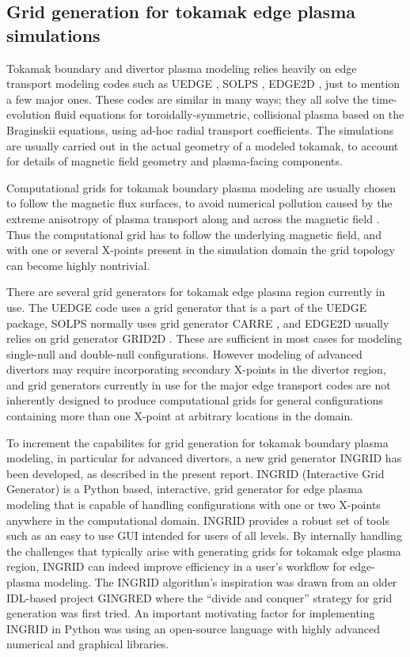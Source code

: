 \subsection{Grid generation for tokamak edge plasma simulations}

Tokamak boundary and divertor plasma modeling relies heavily on edge
transport modeling codes such as UEDGE \cite{Rognlien1999}, SOLPS
\cite{Wiesen2015}, EDGE2D \cite{Simonini1994}, just to mention a few
major ones. These codes are similar in many ways; they all solve the
time-evolution fluid equations for toroidally-symmetric, collisional
plasma based on the Braginskii equations, using ad-hoc radial
transport coefficients. The simulations are usually carried out in the
actual geometry of a modeled tokamak, to account for details of
magnetic field geometry and plasma-facing components.

Computational grids for tokamak boundary plasma modeling are usually
chosen to follow the magnetic flux surfaces, to avoid numerical
pollution caused by the extreme anisotropy of plasma transport along
and across the magnetic field \cite{Umansky2005}. Thus the
computational grid has to follow the underlying magnetic field, and
with one or several X-points present in the simulation domain the grid
topology can become highly nontrivial.

There are several grid generators for tokamak edge plasma region
currently in use. The UEDGE code uses a grid generator that is a part
of the UEDGE package, SOLPS normally uses grid generator CARRE
\cite{Marchand1996}, and EDGE2D usually relies on grid generator GRID2D
\cite{Taroni1992}. These are sufficient in most cases for modeling
single-null and double-null configurations. However modeling of
advanced divertors may require incorporating secondary X-points in the
divertor region, and grid generators currently in use for the major
edge transport codes are not inherently designed to produce
computational grids for general configurations containing more than
one X-point at arbitrary locations in the domain.

To increment the capabilites for grid generation for tokamak boundary
plasma modeling, in particular for advanced divertors, a new grid
generator INGRID has been developed, as described in the present
report.  INGRID (Interactive Grid Generator) is a Python based,
interactive, grid generator for edge plasma modeling that is capable
of handling configurations with one or two X-points anywhere in the
computational domain. INGRID provides a robust set of tools such as an
easy to use GUI intended for users of all levels. By internally
handling the challenges that typically arise with generating grids for
tokamak edge plasma region, INGRID can indeed improve efficiency in a
user's workflow for edge-plasma modeling. The INGRID algorithm's
inspiration was drawn from an older IDL-based project GINGRED
\cite{Izacard2017} where the ``divide and conquer'' strategy for
grid generation was first tried. An important motivating factor for
implementing INGRID in Python was using an open-source language with
highly advanced numerical and graphical libraries.



